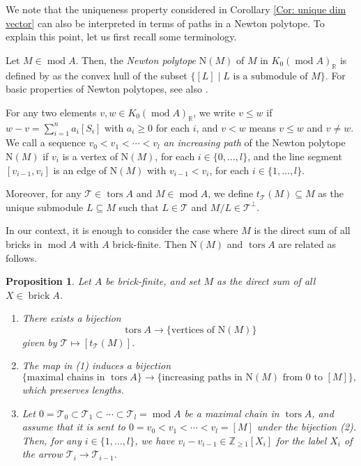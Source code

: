 \documentclass{amsart}
\theoremstyle{thmstyle}
\newtheorem{proposition}[thm]{Proposition}
\theoremstyle{exstyle}
\theoremstyle{defstyle}
\theoremstyle{remstyle}
\theoremstyle{remstyle}
\DeclareMathOperator*{\modu}{mod}
\DeclareMathOperator*{\brick}{brick}
\DeclareMathOperator*{\tors}{tors}
\begin{document}
We note that the uniqueness property considered in Corollary \ref{Cor: unique dim vector} can also be interpreted in terms of paths in a Newton polytope. To explain this point, let us first recall some terminology.

Let $M \in \modu A$. Then, the \emph{Newton polytope} $\mathrm{N}(M)$ of $M$ in $K_0(\modu A)_\mathbb{R}$ is defined by \cite{BKT,Fe1} as the convex hull of the subset $\{[L] \mid \text{$L$ is a submodule of $M$}\}$. For basic properties of Newton polytopes, see also \cite{AH+,Fe2}.

For any two elements $v,w \in K_0(\modu A)_\mathbb{R}$, we write $v \le w$ if $w-v=\sum_{i=1}^n a_i[S_i]$ with $a_i \ge 0$ for each $i$, and $v<w$ means $v \le w$ and $v \ne w$.  We call a sequence $v_0<v_1<\cdots<v_l$ \emph{an increasing path} of the Newton polytope $\mathrm{N}(M)$ if $v_i$ is a vertex of $\mathrm{N}(M)$, for each $i \in \{0,\ldots,l\}$, and the line segment $[v_{i-1},v_i]$ is an edge of $\mathrm{N}(M)$ with $v_{i-1}<v_i$, for each $i \in \{1,\ldots,l\}$. 

Moreover, for any $\mathcal{T} \in \tors A$ and $M \in \modu A$, we define $t_\mathcal{T}(M) \subseteq M$ as the unique submodule $L \subseteq M$ such that $L \in \mathcal{T}$ and $M/L \in \mathcal{T}^\perp$.

In our context, it is enough to consider the case where $M$ is the direct sum of all bricks in $\modu A$ with $A$ brick-finite. Then $\mathrm{N}(M)$ and $\tors A$ are related as follows.

\begin{proposition}\label{Prop: Newton polytopes}\cite[Subsection 5.3]{AH+} \cite[Subsection 9.2]{Fe2}
Let $A$ be brick-finite, and set $M$ as the direct sum of all $X \in \brick A$. 
\begin{enumerate}
\item 
There exists a bijection
$$\tors A \to \{\text{vertices of $\mathrm{N}(M)$}\}$$ 
given by $\mathcal{T} \mapsto [t_\mathcal{T}(M)]$.
\item 
The map in (1) induces a bijection 
$$ \{\text{maximal chains in $\tors A$}\} \to \{\text{increasing paths in $\mathrm{N}(M)$ from $0$ to $[M]$}\},$$
which preserves lengths.
\item
Let $0=\mathcal{T}_0 \subset \mathcal{T}_1 \subset \cdots \subset \mathcal{T}_l=\modu A$ be a maximal chain in $\tors A$, and assume that it is sent to $0=v_0<v_1<\cdots<v_l=[M]$ under the bijection (2). Then, for any $i \in \{1,\ldots,l\}$, we have $v_i-v_{i-1} \in \mathbb{Z}_{\ge 1}[X_i]$ for the label $X_i$ of the arrow $\mathcal{T}_i \to \mathcal{T}_{i-1}$.
\end{enumerate}
\end{proposition}
\end{document}
